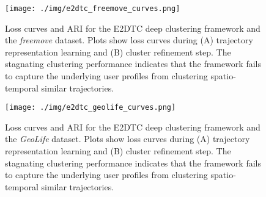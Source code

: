 \begin{figure}[H]
    \centering
    \texttt{[image: ./img/e2dtc\_freemove\_curves.png]}
    \caption{Loss curves and ARI for the E2DTC deep clustering framework and the \textit{freemove} dataset. Plots show loss curves during (A) trajectory representation learning and (B) cluster refinement step. The stagnating clustering performance indicates that the framework fails to capture the underlying user profiles from clustering spatio-temporal similar trajectories.}
    \label{Figure:e2dtc_freemove_curves}
\end{figure}

\begin{figure}[H]
    \centering
    \texttt{[image: ./img/e2dtc\_geolife\_curves.png]}
    \caption{Loss curves and ARI for the E2DTC deep clustering framework and the \textit{GeoLife} dataset. Plots show loss curves during (A) trajectory representation learning and (B) cluster refinement step. The stagnating clustering performance indicates that the framework fails to capture the underlying user profiles from clustering spatio-temporal similar trajectories.}
    \label{Figure:e2dtc_geolife_curves}
\end{figure}


